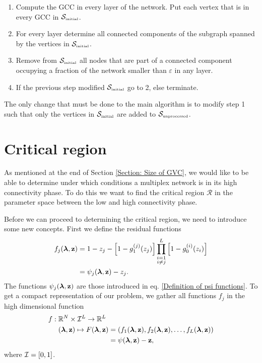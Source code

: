 \documentclass[
11pt, %
american, %
singlespacing, %
final, %
nolistspacing, %
liststotoc, %
headsepline, %
]{MastersDoctoralThesis} %
\begin{document}
\begin{enumerate}
	\item Compute the GCC in every layer of the network. Put each vertex that is in every GCC in $\mathcal{S}_{\text{\tiny initial}}$.
	\item For every layer determine all connected components of the subgraph spanned by the vertices in $\mathcal{S}_{\text{\tiny initial}}$.
	\item Remove from $\mathcal{S}_{\text{\tiny initial}}$ all nodes that are part of a connected component occupying a fraction of the network smaller than $\varepsilon$ in any layer.
	\item If the previous step modified $\mathcal{S}_{\text{\tiny initial}}$ go to 2, else terminate.
\end{enumerate}

The only change that must be done to the main algorithm is to modify step 1 such that only the vertices in $\mathcal{S}_{\text{\tiny initial}}$ are added to $\mathcal{S}_{\text{\tiny unprocessed}}$.

\section{Critical region}
\label{Section: Boundary condition for multilayer}

As mentioned at the end of Section \ref{Section: Size of GVC}, we would like to be able to determine under which conditions a multiplex network is in its high connectivity phase. To do this we want to find the critical region $\mathcal{R}$ in the parameter space between the low and high connectivity phase.

Before we can proceed to determining the critical region, we need to introduce some new concepts. First we define the residual functions
\begin{align}
	f_j(\boldsymbol{\mathrm{\lambda}}, \boldsymbol{\mathrm{z}}) &= 1 - z_j - \left[1 - g_1^{(j)}(z_j) \right] \prod_{\substack{i = 1 \\ i \neq j}}^{L}  \left[1 - g_0^{(i)}(z_i) \right] \label{Definition fj} \\
		&= \psi_j(\boldsymbol{\mathrm{\lambda}}, \boldsymbol{\mathrm{z}}) - z_j.
\end{align}
The functions $\psi_j(\boldsymbol{\mathrm{\lambda}}, \boldsymbol{\mathrm{z}})$ are those introduced in eq. \eqref{Definition of psi functions}. To get a compact representation of our problem, we gather all functions $f_j$ in the high dimensional function
\begin{align}
	f : \; &\mathbb{R}^N \times \unitinterval^L \rightarrow \mathbb{R}^L\\
	&(\lambdavec, \zvec) \mapsto F(\lambdavec, \zvec) = (f_1(\lambdavec, \zvec), f_2(\lambdavec, \zvec), \dots, f_L(\lambdavec, \zvec)) \label{Definition F} \\
		&\hphantom{(\lambdavec, \zvec) \mapsto F(\lambdavec, \zvec)} = \psi(\lambdavec, \zvec) - \zvec,
\end{align}
where $\mathcal{I} = [0, 1]$.
\end{document}
